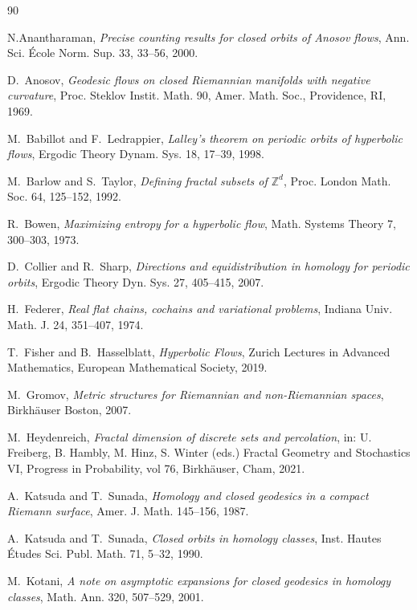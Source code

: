\documentclass[11pt]{amsart}
\theoremstyle{definition}
\numberwithin{equation}{section}
\numberwithin{theorem}{section}
\def\Z{\mathbb{Z}}
\begin{document}
\begin{thebibliography}{90}

N.Anantharaman,
\emph{Precise counting results for closed orbits of Anosov flows},
Ann. Sci. \'Ecole Norm. Sup. 33, 33--56, 2000.

D.~Anosov, \emph{Geodesic flows on closed Riemannian manifolds
with negative curvature}, Proc. Steklov Instit. Math. 90,
Amer. Math. Soc., Providence, RI, 1969. 

M.~Babillot and F.~Ledrappier,
\emph{Lalley's theorem on periodic orbits of hyperbolic flows},
Ergodic Theory Dynam. Sys. 18, 17--39, 1998.

M.~Barlow and S.~Taylor,
\emph{Defining fractal subsets of $\Z^d$},
Proc. London Math. Soc. 64, 125--152, 1992.

R.~Bowen,
\emph{Maximizing entropy for a hyperbolic flow},
Math. Systems Theory 7, 300--303, 1973.

D.~Collier and R.~Sharp,
\emph{Directions and equidistribution in homology for periodic orbits},
Ergodic Theory Dyn. Sys. 27, 405--415, 2007.

H.~Federer,
\emph{Real flat chains, cochains and variational problems},
Indiana Univ. Math. J. 24, 351--407, 1974.

 T.~Fisher and B.~Hasselblatt, \textit{Hyperbolic Flows}, Zurich Lectures in Advanced Mathematics, European Mathematical Society, 2019.


M.~Gromov, 
\emph{Metric structures for Riemannian and non-Riemannian spaces},
Birkh\"auser Boston, 2007.

M.~Heydenreich,
\emph{Fractal dimension of discrete sets and percolation},
in: U. Freiberg, B. Hambly, M. Hinz, S. Winter (eds.) Fractal Geometry and Stochastics VI,
Progress in Probability, vol 76, Birkh\"auser, Cham, 2021.

A.~Katsuda and T.~Sunada,
\emph{Homology and closed geodesics in a compact Riemann surface},
Amer. J. Math. 145--156, 1987.


A.~Katsuda and T.~Sunada,
\emph{Closed orbits in homology classes},
Inst. Hautes \'Etudes Sci. Publ. Math. 71, 5--32, 1990.

M.~Kotani,
\emph{A note on asymptotic expansions for closed geodesics in homology classes},
Math. Ann. 320, 507--529, 2001.



\end{thebibliography}
\end{document}
